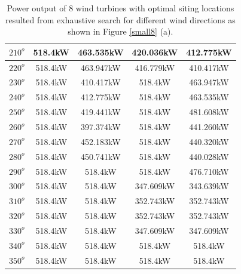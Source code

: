 \begin{table}[H]
\begin{tabular}{|c|c|c|c|c|}
        		$210^o$	& 518.4kW	& 463.535kW	& 420.036kW	& 412.775kW	\\ \hline
        		$220^o$	& 518.4kW	& 463.947kW	& 416.779kW	& 410.417kW	\\ \hline
        		$230^o$	& 518.4kW	& 410.417kW	& 518.4kW	& 463.947kW	\\ \hline
        		$240^o$	& 518.4kW	& 412.775kW	& 518.4kW	& 463.535kW	\\ \hline
        		$250^o$	& 518.4kW	& 419.441kW	& 518.4kW	& 481.608kW	\\ \hline
        		$260^o$	& 518.4kW	& 397.374kW	& 518.4kW	& 441.260kW	\\ \hline
        		$270^o$	& 518.4kW	& 452.183kW	& 518.4kW	& 440.320kW	\\ \hline
        		$280^o$	& 518.4kW	& 450.741kW	& 518.4kW	& 440.028kW	\\ \hline
        		$290^o$	& 518.4kW	& 518.4kW	& 518.4kW	& 476.710kW	\\ \hline
        		$300^o$	& 518.4kW	& 518.4kW	& 347.609kW	& 343.639kW	\\ \hline
        		$310^o$	& 518.4kW	& 518.4kW	& 352.743kW	& 352.743kW	\\ \hline
        		$320^o$	& 518.4kW	& 518.4kW	& 352.743kW	& 352.743kW	\\ \hline
        		$330^o$	& 518.4kW	& 518.4kW	& 347.609kW	& 347.609kW	\\ \hline
        		$340^o$	& 518.4kW	& 518.4kW	& 518.4kW	& 518.4kW	\\ \hline
        		$350^o$	& 518.4kW	& 518.4kW	& 518.4kW	& 518.4kW	\\ \hline
        	\end{tabular}
        	\caption{Power output of 8 wind turbines with optimal siting locations resulted from exhaustive search for different wind directions as shown in Figure \ref{small8} (a).}
        	\label{table8a}
        \end{table}
